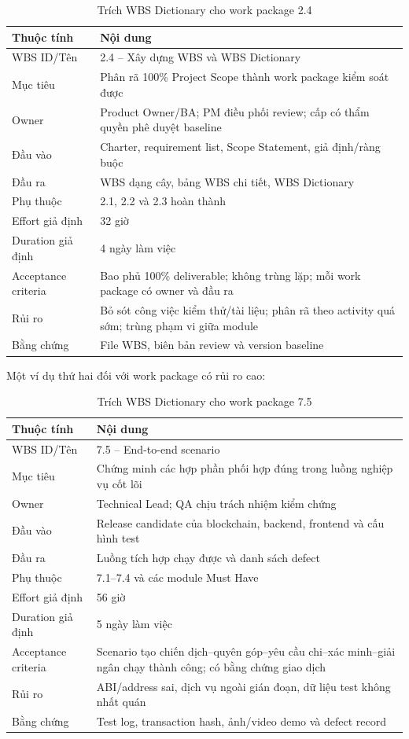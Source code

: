 \begin{longtable}{| p{3cm} | p{9.8cm} |}
\caption{Trích WBS Dictionary cho work package 2.4}\label{tab:wbs-dictionary}\\
\hline
\textbf{Thuộc tính} & \textbf{Nội dung} \\
\hline
WBS ID/Tên & 2.4 -- Xây dựng WBS và WBS Dictionary \\ \hline
Mục tiêu & Phân rã 100\% Project Scope thành work package kiểm soát được \\ \hline
Owner & Product Owner/BA; PM điều phối review; cấp có thẩm quyền phê duyệt baseline \\ \hline
Đầu vào & Charter, requirement list, Scope Statement, giả định/ràng buộc \\ \hline
Đầu ra & WBS dạng cây, bảng WBS chi tiết, WBS Dictionary \\ \hline
Phụ thuộc & 2.1, 2.2 và 2.3 hoàn thành \\ \hline
Effort giả định & 32 giờ \\ \hline
Duration giả định & 4 ngày làm việc \\ \hline
Acceptance criteria & Bao phủ 100\% deliverable; không trùng lặp; mỗi work package có owner và đầu ra \\ \hline
Rủi ro & Bỏ sót công việc kiểm thử/tài liệu; phân rã theo activity quá sớm; trùng phạm vi giữa module \\ \hline
Bằng chứng & File WBS, biên bản review và version baseline \\
\hline
\end{longtable}

Một ví dụ thứ hai đối với work package có rủi ro cao:

\begin{longtable}{| p{3cm} | p{9.8cm} |}
\caption{Trích WBS Dictionary cho work package 7.5}\label{tab:wbs-dictionary-e2e}\\
\hline
\textbf{Thuộc tính} & \textbf{Nội dung} \\
\hline
WBS ID/Tên & 7.5 -- End-to-end scenario \\ \hline
Mục tiêu & Chứng minh các hợp phần phối hợp đúng trong luồng nghiệp vụ cốt lõi \\ \hline
Owner & Technical Lead; QA chịu trách nhiệm kiểm chứng \\ \hline
Đầu vào & Release candidate của blockchain, backend, frontend và cấu hình test \\ \hline
Đầu ra & Luồng tích hợp chạy được và danh sách defect \\ \hline
Phụ thuộc & 7.1--7.4 và các module Must Have \\ \hline
Effort giả định & 56 giờ \\ \hline
Duration giả định & 5 ngày làm việc \\ \hline
Acceptance criteria & Scenario tạo chiến dịch--quyên góp--yêu cầu chi--xác minh--giải ngân chạy thành công; có bằng chứng giao dịch \\ \hline
Rủi ro & ABI/address sai, dịch vụ ngoài gián đoạn, dữ liệu test không nhất quán \\ \hline
Bằng chứng & Test log, transaction hash, ảnh/video demo và defect record \\
\hline
\end{longtable}


